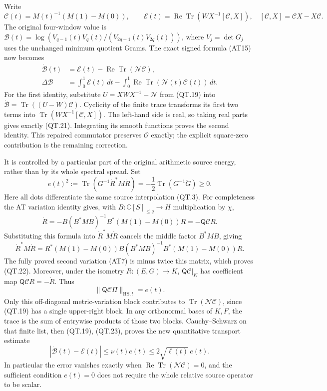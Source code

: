 Write
\[
 \mathcal C(t)=M(t)^{-1}(M(1)-M(0)),\qquad
 \mathcal E(t)=\operatorname{Re}
       \operatorname{Tr}\!\left(WX^{-1}[\mathcal C,X]\right),
 \quad [\mathcal C,X]=\mathcal CX-X\mathcal C.
 \tag{QT.20}\label{CFStage:eq:qt-correctedintegrand}
\]
The original four-window value is
\(\mathcal B(t)=\log(V_{q-1}(t)V_q(t)/(V_{2q-1}(t)V_{2q}(t)))\),
where \(V_j=\det G_j\) uses the unchanged minimum quotient Grams.
The exact signed formula (AT15) now becomes
\[
 \begin{split}
 \dot{\mathcal B}(t)
 &=\mathcal E(t)-\operatorname{Re}\operatorname{Tr}
                                      (\mathcal N\mathcal C),\\
 \Delta\mathcal B
 &=\int_0^1\mathcal E(t)\,dt
       -\int_0^1\operatorname{Re}\operatorname{Tr}
                                      (\mathcal N(t)\mathcal C(t))\,dt.
 \end{split}
 \tag{QT.21}\label{CFStage:eq:qt-signedexact}
\]
For the first identity, substitute
\(U=XWX^{-1}-\mathcal N\) from (QT.19) into
\(\dot{\mathcal B}=\operatorname{Tr}((U-W)\mathcal C)\).
Cyclicity of the finite trace transforms its first two terms into
\(\operatorname{Tr}(WX^{-1}[\mathcal C,X])\).
The left-hand side is real, so taking real parts gives exactly (QT.21).
Integrating its smooth functions proves the second identity.
This repaired commutator preserves \(\mathcal O\) exactly; the
explicit square-zero contribution is the remaining correction.

It is controlled by a particular part of the original arithmetic
source energy, rather than by its whole spectral spread. Set
\[
 e(t)^2
 :=\operatorname{Tr}\!\left(G^{-1}\dot R^*M\dot R\right)
 =-\frac12\operatorname{Tr}(G^{-1}\ddot G)\ge0.
 \tag{QT.22}\label{CFStage:eq:qt-speed}
\]
Here all dots differentiate the same source interpolation (QT.3).
For completeness the AT variation identity gives, with
\(B:\mathbb C[S]_{\le q}\to H\) multiplication by \(\chi\),
\[
 \dot R=-B(B^*MB)^{-1}B^*(M(1)-M(0))R
       =-\mathsf Q\mathcal C R.
 \]
Substituting this formula into \(\dot R^*M\dot R\) cancels the
middle factor \(B^*MB\), giving
\[
 \dot R^*M\dot R
 =R^*(M(1)-M(0))B(B^*MB)^{-1}B^*(M(1)-M(0))R.
 \]
The fully proved second variation (AT7) is minus twice this matrix,
which proves (QT.22).
Moreover, under the isometry \(R:(E,G)\to K\),
\(\mathsf Q\mathcal C|_K\) has coefficient map
\(\mathsf Q\mathcal C R=-\dot R\). Thus
\[
 \|\mathsf Q\mathcal C\Pi\|_{\mathrm{HS},t}=e(t).
 \tag{QT.23}\label{CFStage:eq:qt-crossspeed}
\]
Only this off-diagonal metric-variation block contributes to
\(\operatorname{Tr}(\mathcal N\mathcal C)\), since (QT.19) has a
single upper-right block. In any orthonormal bases of \(K,F\),
the trace is the sum of entrywise products of those two blocks.
Cauchy--Schwarz on that finite list, then (QT.19), (QT.23), proves
the new quantitative transport estimate
\[
 \boxed{\;
 |\dot{\mathcal B}(t)-\mathcal E(t)|
       \le\nu(t)e(t)\le2\sqrt{\ell(t)}\,e(t).
 \;}
 \tag{QT.24}\label{CFStage:eq:qt-localbound}
\]
In particular the error vanishes exactly when
\(\operatorname{Re}\operatorname{Tr}(\mathcal N\mathcal C)=0\),
and the sufficient condition \(e(t)=0\)
does not require the whole relative source operator to be scalar.

